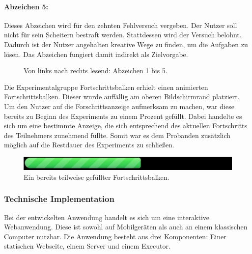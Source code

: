 \paragraph{Abzeichen 5:}
Dieses Abzeichen wird für den zehnten Fehlversuch vergeben. Der Nutzer soll nicht für sein Scheitern bestraft werden. Stattdessen wird der Versuch belohnt. Dadurch ist der Nutzer angehalten kreative Wege zu finden, um die Aufgaben zu lösen. Das Abzeichen fungiert damit indirekt als Zielvorgabe.


\begin{figure}[htbp]
    \centering
    
    
    
    
    
    \caption{Von links nach rechts lesend: Abzeichen 1 bis 5.}
\end{figure}


Die Experimentalgruppe Fortschrittsbalken erhielt einen animierten Fortschrittsbalken. Dieser wurde auffällig am oberen Bildschirmrand platziert. Um den Nutzer auf die Forschrittsanzeige aufmerksam zu machen, war diese bereits zu Beginn des Experiments zu einem Prozent gefüllt. Dabei handelte es sich um eine bestimmte Anzeige, die sich entsprechend des aktuellen Fortschritts des Teilnehmers zunehmend füllte. Somit war es dem Probanden zusätzlich möglich auf die Restdauer des Experiments zu schließen.

\begin{figure}[htbp]
    \centering
    \includegraphics[width=\textwidth]{img/progressbar.png}
    \caption{Ein bereits teilweise gefüllter Fortschrittsbalken.}
\end{figure}

\subsubsection{Technische Implementation}
Bei der entwickelten Anwendung handelt es sich um eine interaktive Webanwendung. Diese ist sowohl auf Mobilgeräten als auch an einem klassischen Computer nutzbar. Die Anwendung besteht aus drei Komponenten: Einer statischen Webseite, einem Server und einem Executor. 

